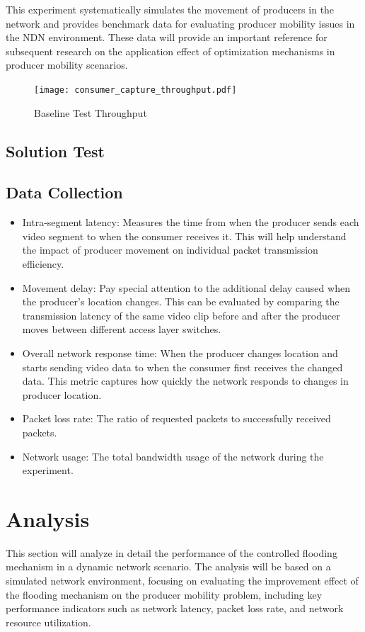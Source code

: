 \documentclass[conference]{IEEEtran}
\begin{document}
This experiment systematically simulates the movement of producers in the network and provides benchmark data for evaluating producer mobility issues in the NDN environment. These data will provide an important reference for subsequent research on the application effect of optimization mechanisms in producer mobility scenarios.

\begin{figure}
    \centering
    \texttt{[image: consumer\_capture\_throughput.pdf]} %
    \caption{Baseline Test Throughput}
    \label{fig:baseline-throughput}
\end{figure}

\subsection{Solution Test}

\subsection{Data Collection}
\begin{itemize}
    \item Intra-segment latency: Measures the time from when the producer sends each video segment to when the consumer receives it. This will help understand the impact of producer movement on individual packet transmission efficiency.
    \item Movement delay: Pay special attention to the additional delay caused when the producer's location changes. This can be evaluated by comparing the transmission latency of the same video clip before and after the producer moves between different access layer switches.
    \item Overall network response time: When the producer changes location and starts sending video data to when the consumer first receives the changed data. This metric captures how quickly the network responds to changes in producer location.
    \item Packet loss rate: The ratio of requested packets to successfully received packets.
    \item Network usage: The total bandwidth usage of the network during the experiment.
\end{itemize}

\section{Analysis}
This section will analyze in detail the performance of the controlled flooding mechanism in a dynamic network scenario. The analysis will be based on a simulated network environment, focusing on evaluating the improvement effect of the flooding mechanism on the producer mobility problem, including key performance indicators such as network latency, packet loss rate, and network resource utilization.
\end{document}
